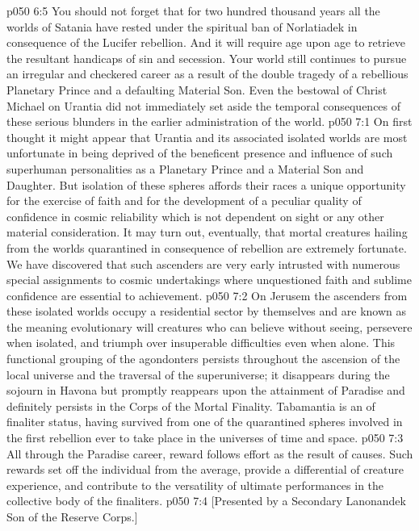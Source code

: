 \pc \vs p050 6:5 You should not forget that for two hundred thousand years all the worlds of Satania have rested under the spiritual ban of Norlatiadek in consequence of the Lucifer rebellion. And it will require age upon age to retrieve the resultant handicaps of sin and secession. Your world still continues to pursue an irregular and checkered career as a result of the double tragedy of a rebellious Planetary Prince and a defaulting Material Son. Even the bestowal of Christ Michael on Urantia did not immediately set aside the temporal consequences of these serious blunders in the earlier administration of the world.
\vs p050 7:1 On first thought it might appear that Urantia and its associated isolated worlds are most unfortunate in being deprived of the beneficent presence and influence of such superhuman personalities as a Planetary Prince and a Material Son and Daughter. But isolation of these spheres affords their races a unique opportunity for the exercise of faith and for the development of a peculiar quality of confidence in cosmic reliability which is not dependent on sight or any other material consideration. It may turn out, eventually, that mortal creatures hailing from the worlds quarantined in consequence of rebellion are extremely fortunate. We have discovered that such ascenders are very early intrusted with numerous special assignments to cosmic undertakings where unquestioned faith and sublime confidence are essential to achievement.
\vs p050 7:2 On Jerusem the ascenders from these isolated worlds occupy a residential sector by themselves and are known as the  meaning evolutionary will creatures who can believe without seeing, persevere when isolated, and triumph over insuperable difficulties even when alone. This functional grouping of the agondonters persists throughout the ascension of the local universe and the traversal of the superuniverse; it disappears during the sojourn in Havona but promptly reappears upon the attainment of Paradise and definitely persists in the Corps of the Mortal Finality. Tabamantia is an  of finaliter status, having survived from one of the quarantined spheres involved in the first rebellion ever to take place in the universes of time and space.
\vs p050 7:3 All through the Paradise career, reward follows effort as the result of causes. Such rewards set off the individual from the average, provide a differential of creature experience, and contribute to the versatility of ultimate performances in the collective body of the finaliters.
\vsetoff
\vs p050 7:4 [Presented by a Secondary Lanonandek Son of the Reserve Corps.]
